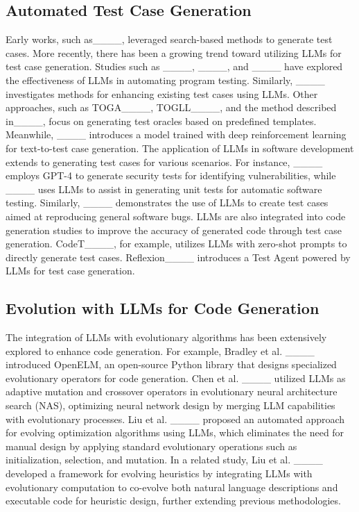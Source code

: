 \subsection{Automated Test Case Generation}
Early works, such as____, leveraged search-based methods to generate test cases.
More recently, there has been a growing trend toward utilizing LLMs for test case generation.
Studies such as ____, ____, and ____ have explored the effectiveness of LLMs in automating program testing.
Similarly, ____ investigates methods for enhancing existing test cases using LLMs.
Other approaches, such as TOGA____, TOGLL____, and the method described in____, 
focus on generating test oracles based on predefined templates.
Meanwhile, ____ introduces a model trained with deep reinforcement learning for text-to-test case generation.
The application of LLMs in software development extends to generating test cases for various scenarios.
For instance, ____ employs GPT-4 to generate security tests for identifying vulnerabilities, while ____ uses LLMs to assist in generating unit tests for automatic software testing.
Similarly, ____ demonstrates the use of LLMs to create test cases aimed at reproducing general software bugs.
LLMs are also integrated into code generation studies to improve the accuracy of generated code through test case generation.
CodeT____, for example, utilizes LLMs with zero-shot prompts to directly generate test cases. Reflexion____ introduces a Test Agent powered by LLMs for test case generation.


\subsection{Evolution with LLMs for Code Generation}
The integration of LLMs with evolutionary algorithms has been extensively explored to enhance code generation.
For example, Bradley et al. ____ introduced OpenELM, an open-source Python library that designs specialized evolutionary operators for code generation.
Chen et al. ____ utilized LLMs as adaptive mutation and crossover operators in evolutionary neural architecture search (NAS),
optimizing neural network design by merging LLM capabilities with evolutionary processes.
Liu et al. ____ proposed an automated approach for evolving optimization algorithms using LLMs, which eliminates the need for manual design by applying standard evolutionary operations such as initialization, selection, and mutation.
In a related study, Liu et al. ____ developed a framework for evolving heuristics by integrating LLMs with evolutionary computation to co-evolve both natural language descriptions and executable code for heuristic design, further extending previous methodologies.

